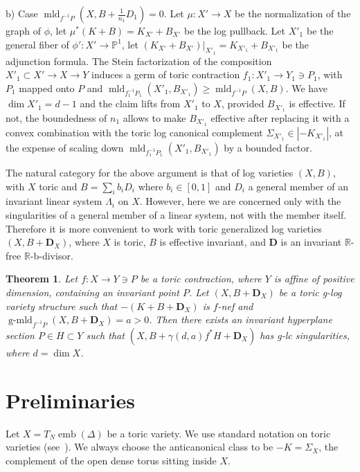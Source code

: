 \documentclass[12pt,twoside]{amsart}
\newcommand{\R}{{\mathbb R}}
\newcommand{\bP}{{\mathbb P}} %
\newcommand{\bD}{{\mathbf D}}
\newcommand{\emb}{\operatorname{emb}}
\newcommand{\mld}{\operatorname{mld}}
\newcommand{\gmld}{\operatorname{g-mld}}
\theoremstyle{plain}
\newtheorem{thm}{Theorem}[section]
\theoremstyle{definition}
\theoremstyle{remark}
\begin{document}
b) Case $\mld_{f^{-1}P}(X,B+\frac{1}{n_1}D_1)=0$. Let $\mu\colon X'\to X$ be the normalization
of the graph of $\phi$, let $\mu^*(K+B)=K_{X'}+B_{X'}$ be the log pullback. Let $X'_1$ be the
general fiber of $\phi'\colon X'\to \bP^1$, let $(K_{X'}+B_{X'})|_{X'_1}=K_{X'_1}+B_{X'_1}$
be the adjunction formula. The Stein factorization of the composition $X'_1\subset X'\to X\to Y$ induces a 
germ of toric contraction $f_1\colon X'_1\to Y_1\ni P_1$, with $P_1$ mapped onto $P$ and 
$\mld_{f_1^{-1}P_1}(X'_1,B_{X'_1})\ge \mld_{f^{-1}P}(X,B)$.
We have $\dim X'_1=d-1$ and the claim lifts from $X'_1$ to $X$, provided
$B_{X'_1}$ is effective. If not, the boundedness of $n_1$ allows to make
$B_{X'_1}$ effective after replacing it with a convex combination with the toric log canonical
complement $\Sigma_{X'_1}\in |-K_{X'_1}|$, at the expense of scaling down 
$\mld_{f_1^{-1}P_1}(X'_1,B_{X'_1})$ by a bounded factor. 

The natural category for the above argument is that of log varieties $(X,B)$, with $X$
toric and $B=\sum_i b_i D_i$ where $b_i\in [0,1]$ and $D_i$ a general member
of an invariant linear system $\Lambda_i$ on $X$. However, here we are concerned only
with the singularities of a general member of a linear system, not with the member itself.
Therefore it is more convenient to work with
toric generalized log varieties $(X,B+\bD_X)$, where $X$ is toric,
$B$ is effective invariant, and $\bD$ is an invariant $\R$-free $\R$-b-divisor. 

\begin{thm}\label{mn}
	Let $f \colon X \to Y\ni P$ be a toric contraction, where $Y$ is affine of positive
	dimension, containing an invariant point $P$. Let $(X,B+\bD_X)$ be a toric
	g-log variety structure such that $-(K+B+\bD_X)$ is $f$-nef and 
	$\gmld_{f^{-1}P}(X,B+\bD_X)=a>0$. Then there exists an invariant hyperplane 
	section $P\in H\subset Y$ such that $(X,B+\gamma(d,a) f^*H+\bD_X)$ has g-lc singularities,
	where $d=\dim X$.
\end{thm}


\section{Preliminaries}


Let $X=T_N\emb(\Delta)$ be a toric variety. We use standard notation on toric varieties
(see~\cite{Oda88}). We always choose the anticanonical class to be $-K=\Sigma_X$,
the complement of the open dense torus sitting inside $X$.
\end{document}
